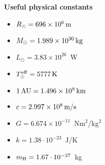 \documentclass[12pt]{article}
\begin{document}
\newpage
{\bf Useful physical constants}
\begin{itemize}
  \item $R_{\odot} = 696 \times 10^6\,{\rm m}$
  \item $M_{\odot} = 1.989 \times 10^{30}\,{\rm kg}$
  \item $L_{\odot} = 3.83 \times 10^{26}$~W
  \item $T^{\rm eff}_{\odot} = 5777\,{\rm K}$
  \item $1\,{\rm AU} = 1.496 \times 10^8\,{\rm km}$
  \item $c = 2.997 \times 10^8\,{\rm m/s}$
  \item $G = 6.674 \times 10^{-11}$~Nm$^2$/kg$^2$
  \item $k = 1.38\cdot10^{-23}$~J/K
  \item $m_{\rm H} = 1.67\cdot10^{-27}$~kg
\end{itemize}
\end{document}
